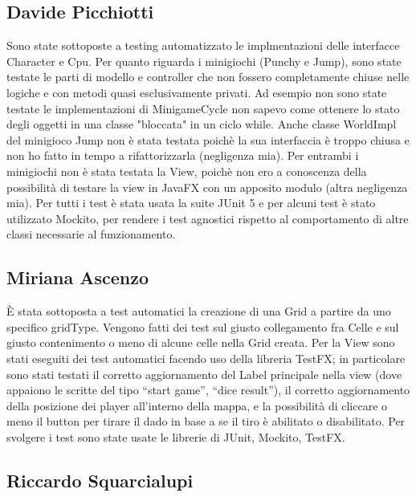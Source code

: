 \documentclass[a4paper,12pt]{report}
\begin{document}
	\subsection{Davide Picchiotti}

    Sono state sottoposte a testing automatizzato le implmentazioni delle interfacce Character e Cpu.
    Per quanto riguarda i minigiochi (Punchy e Jump), sono state testate le parti di modello e controller che
    non fossero completamente chiuse nelle logiche e con metodi quasi esclusivamente privati.\newline
    Ad esempio non sono state testate le implementazioni di MinigameCycle non sapevo come ottenere lo stato degli oggetti
    in una classe "bloccata" in un ciclo while.\newline
    Anche classe WorldImpl del minigioco Jump non è stata testata poichè la sua interfaccia è troppo chiusa e non ho fatto in tempo a
    rifattorizzarla (negligenza mia).\newline
    Per entrambi i minigiochi non è stata testata la View, poichè non ero a conoscenza della possibilità di testare la view in JavaFX con
    un apposito modulo (altra negligenza mia).\newline
    \newline
    Per tutti i test è stata usata la suite JUnit 5 e per alcuni test è stato utilizzato Mockito, per rendere i test agnostici
    rispetto al comportamento di altre classi necessarie al funzionamento.

	\subsection{Miriana Ascenzo}

	È stata sottoposta a test automatici la creazione di una Grid a partire da uno specifico gridType.
	Vengono fatti dei test sul giusto collegamento fra Celle e sul giusto contenimento o meno di alcune celle nella Grid creata.
	Per la View sono stati eseguiti dei test automatici facendo uso della libreria TestFX; in particolare sono stati testati il corretto aggiornamento del Label principale nella view (dove appaiono le scritte del tipo “start game”, “dice result”),
	il corretto aggiornamento della posizione dei player all'interno della mappa, e la possibilità di cliccare o meno il button per tirare il dado in base a se il tiro è abilitato o disabilitato.
    Per svolgere i test sono state usate le librerie di JUnit, Mockito, TestFX.


	\subsection{Riccardo Squarcialupi}
	
\end{document}
